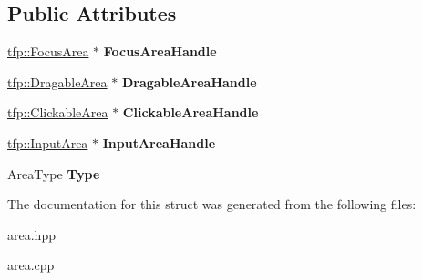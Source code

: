 \subsection*{Public Attributes}
\begin{DoxyCompactItemize}
\item 
\mbox{\label{structtfp_1_1_area_list_class_1_1_node_a02061da52a83b6b6670a52828acb4070}} 
\mbox{\hyperlink{classtfp_1_1_focus_area}{tfp\+::\+Focus\+Area}} $\ast$ {\bfseries Focus\+Area\+Handle}
\item 
\mbox{\label{structtfp_1_1_area_list_class_1_1_node_ab46a54b11ca6e1e4bcdeb678d2de2d25}} 
\mbox{\hyperlink{classtfp_1_1_dragable_area}{tfp\+::\+Dragable\+Area}} $\ast$ {\bfseries Dragable\+Area\+Handle}
\item 
\mbox{\label{structtfp_1_1_area_list_class_1_1_node_a8d5ad2e1b4303fa7504574867a0d6484}} 
\mbox{\hyperlink{classtfp_1_1_clickable_area}{tfp\+::\+Clickable\+Area}} $\ast$ {\bfseries Clickable\+Area\+Handle}
\item 
\mbox{\label{structtfp_1_1_area_list_class_1_1_node_aabd321fde79cea8d6a331b616a02634b}} 
\mbox{\hyperlink{classtfp_1_1_input_area}{tfp\+::\+Input\+Area}} $\ast$ {\bfseries Input\+Area\+Handle}
\item 
\mbox{\label{structtfp_1_1_area_list_class_1_1_node_adc6c2b6feb7797349a9823649ce8dba6}} 
Area\+Type {\bfseries Type}
\end{DoxyCompactItemize}


The documentation for this struct was generated from the following files\+:\begin{DoxyCompactItemize}
\item 
area.\+hpp\item 
area.\+cpp\end{DoxyCompactItemize}
